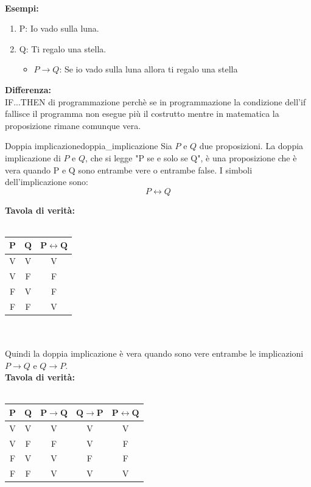 \documentclass[12pt, letterpaper]{report}
\newcounter{definition}
\newcommand{\nmu}{}
\begin{document}
	\\
	\textbf{Esempi:}
	\begin{enumerate}
		\item P: Io vado sulla luna.
		\item Q: Ti regalo una stella.
		\begin{itemize}
			\item $P \to Q$: Se io vado sulla luna allora ti regalo una stella
		\end{itemize}
	\end{enumerate}
	\textbf{Differenza: }
	\\
	IF...THEN di programmazione perchè se in programmazione la condizione dell'if fallisce il programma non esegue più il costrutto mentre in matematica la proposizione rimane comunque vera.
	\newpage
	\begin{definition}{\nmu Doppia implicazione}{doppia_implicazione}
		Sia $P$ e $Q$ due proposizioni. La doppia implicazione di $P$ e $Q$, che si legge "P se e solo se Q", è una proposizione che è vera quando P e Q sono entrambe vere o entrambe false.
		I simboli dell'implicazione sono:
		\[
		P \leftrightarrow  Q
		\]
	\end{definition}
	\textbf{Tavola di verità:}
	\\
	\\
	\begin{tabular}{c|c|c}
		$\mathbf{P}$ & $\mathbf{Q}$ & $\mathbf{P \leftrightarrow Q}$ \\
		\hline
		V & V & V \\
		V & F & F \\
		F & V & F \\
		F & F & V \\
	\end{tabular}
	\\
	\\
	Quindi la doppia implicazione è vera quando sono vere entrambe le implicazioni $P \to Q$ e $Q \to P$.
	\\
	\textbf{Tavola di verità:}
	\\
	\\
	\begin{tabular}{c|c|c|c|c}
		$\mathbf{P}$ & $\mathbf{Q}$ & $\mathbf{P \to Q}$ & $\mathbf{Q \to P}$ & $\mathbf{P \leftrightarrow Q}$ \\
		\hline
		V & V & V & V & V \\
		V & F & F & V & F \\
		F & V & V & F & F \\
		F & F & V & V & V \\
	\end{tabular}
\end{document}
